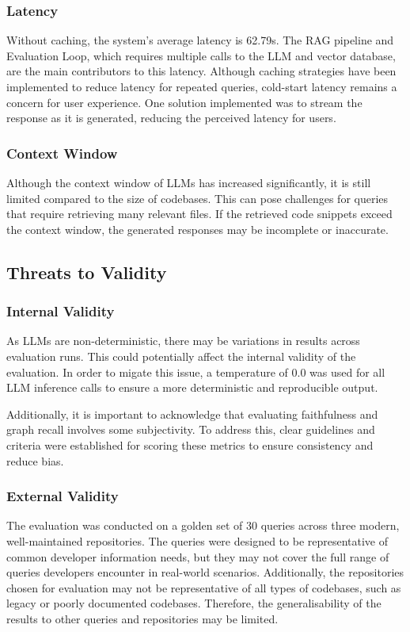 \subsubsection{Latency}
Without caching, the system's average latency is 62.79s. The RAG pipeline and Evaluation Loop, which requires multiple calls to the LLM and vector database, are the main contributors to this latency. Although caching strategies have been implemented to reduce latency for repeated queries, cold-start latency remains a concern for user experience. One solution implemented was to stream the response as it is generated, reducing the perceived latency for users.

\subsubsection{Context Window}
Although the context window of LLMs has increased significantly, it is still limited compared to the size of codebases. This can pose challenges for queries that require retrieving many relevant files. If the retrieved code snippets exceed the context window, the generated responses may be incomplete or inaccurate.

\subsection{Threats to Validity}
\subsubsection{Internal Validity} 
As LLMs are non-deterministic, there may be variations in results across evaluation runs. This could potentially affect the internal validity of the evaluation. In order to migate this issue, a temperature of 0.0 was used for all LLM inference calls to ensure a more deterministic and reproducible output.

Additionally, it is important to acknowledge that evaluating faithfulness and graph recall involves some subjectivity. To address this, clear guidelines and criteria were established for scoring these metrics to ensure consistency and reduce bias. 
\subsubsection{External Validity}
The evaluation was conducted on a golden set of 30 queries across three modern, well-maintained repositories. The queries were designed to be representative of common developer information needs, but they may not cover the full range of queries developers encounter in real-world scenarios. Additionally, the repositories chosen for evaluation may not be representative of all types of codebases, such as legacy or poorly documented codebases. Therefore, the generalisability of the results to other queries and repositories may be limited.

